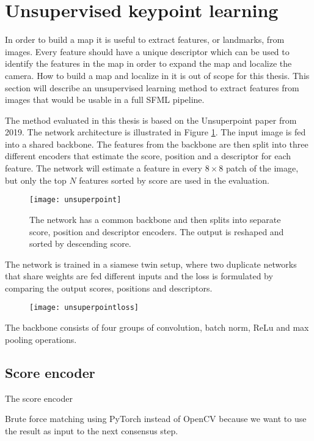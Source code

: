 \section{Unsupervised keypoint learning}

In order to build a map it is useful to extract features, or landmarks, from images. Every feature should have a unique descriptor which can be used to identify the features in the map in order to expand the map and localize the camera. How to build a map and localize in it is out of scope for this thesis. This section will describe an unsupervised learning method to extract features from images that would be usable in a full SFML pipeline.

The method evaluated in this thesis is based on the Unsuperpoint paper \cite{unsuperpoint} from 2019. The network architecture is illustrated in Figure \ref{fig:unsuperpoint}. The input image is fed into a shared backbone. The features from the backbone are then split into three different encoders that estimate the score, position and a descriptor for each feature. The network will estimate a feature in every $8\times 8$ patch of the image, but only the top $N$ features sorted by score are used in the evaluation.

\begin{figure}[H]
	\centering
	\texttt{[image: unsuperpoint]}
	\caption{The network has a common backbone and then splits into separate score, position and descriptor encoders. The output is reshaped and sorted by descending score.}
	\label{fig:unsuperpoint}
\end{figure}

The network is trained in a siamese twin setup, where two duplicate networks that share weights are fed different inputs and the loss is formulated by comparing the output scores, positions and descriptors.

\begin{figure}[H]
	\centering
	\texttt{[image: unsuperpointloss]}
	\caption{}
	\label{fig:unsuperpointloss}
\end{figure}

The backbone consists of four groups of convolution, batch norm, ReLu and max pooling operations.

\subsection{Score encoder}

The score encoder 

Brute force matching using PyTorch instead of OpenCV because we want to use the result as input to the next consensus step.